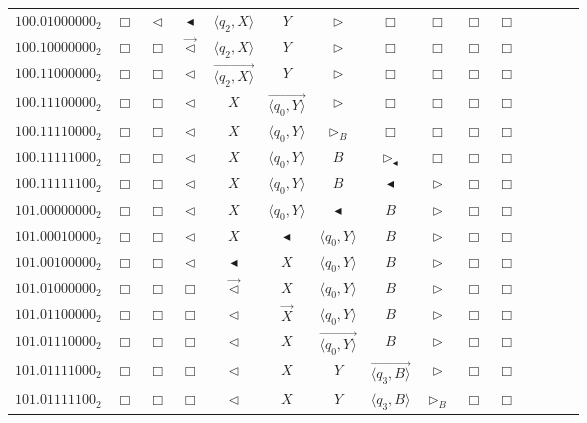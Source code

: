 \documentclass[pre,showpacs,showkeys,preprint]{revtex4}
\theoremstyle{definition}
\begin{document}
\begin{figure}
\begin{center}
{\begin{tabular}{r|cccccccccccccc}
$100.01000000_2$ & $\Box$ & $\lhd$ & $\blacktriangleleft$ & $\langle q_2,X \rangle$ & $Y$ & $\rhd$ & $\Box$ & $\Box$ & $\Box$ & $\Box$ \\
$100.10000000_2$ & $\Box$ & $\Box$ & $\overrightarrow{\lhd}$ & $\langle q_2,X \rangle$ & $Y$ & $\rhd$ & $\Box$ & $\Box$ & $\Box$ & $\Box$ \\
$100.11000000_2$ & $\Box$ & $\Box$ & $\lhd$ & $\overrightarrow{\langle q_2,X \rangle}$ & $Y$ & $\rhd$ & $\Box$ & $\Box$ & $\Box$ & $\Box$ \\
$100.11100000_2$ & $\Box$ & $\Box$ & $\lhd$ & $X$ & $\overrightarrow{\langle q_0,Y \rangle}$ & $\rhd$ & $\Box$ & $\Box$ & $\Box$ & $\Box$ \\
$100.11110000_2$ & $\Box$ & $\Box$ & $\lhd$ & $X$ & $\langle q_0,Y \rangle$ & $\rhd_B$ & $\Box$ & $\Box$ & $\Box$ & $\Box$ \\
$100.11111000_2$ & $\Box$ & $\Box$ & $\lhd$ & $X$ & $\langle q_0,Y \rangle$ & $B$ & $\rhd_\blacktriangleleft$ & $\Box$ & $\Box$ & $\Box$ \\
$100.11111100_2$ & $\Box$ & $\Box$ & $\lhd$ & $X$ & $\langle q_0,Y \rangle$ & $B$ & $\blacktriangleleft$ & $\rhd$ & $\Box$ & $\Box$ \\
$101.00000000_2$ & $\Box$ & $\Box$ & $\lhd$ & $X$ & $\langle q_0,Y \rangle$ & $\blacktriangleleft$ & $B$ & $\rhd$ & $\Box$ & $\Box$ \\
$101.00010000_2$ & $\Box$ & $\Box$ & $\lhd$ & $X$ & $\blacktriangleleft$ & $\langle q_0,Y \rangle$ & $B$ & $\rhd$ & $\Box$ & $\Box$ \\
$101.00100000_2$ & $\Box$ & $\Box$ & $\lhd$ & $\blacktriangleleft$ & $X$ & $\langle q_0,Y \rangle$ & $B$ & $\rhd$ & $\Box$ & $\Box$ \\
$101.01000000_2$ & $\Box$ & $\Box$ & $\Box$ & $\overrightarrow{\lhd}$ & $X$ & $\langle q_0,Y \rangle$ & $B$ & $\rhd$ & $\Box$ & $\Box$ \\
$101.01100000_2$ & $\Box$ & $\Box$ & $\Box$ & $\lhd$ & $\overrightarrow{X}$ & $\langle q_0,Y \rangle$ & $B$ & $\rhd$ & $\Box$ & $\Box$ \\
$101.01110000_2$ & $\Box$ & $\Box$ & $\Box$ & $\lhd$ & $X$ & $\overrightarrow{\langle q_0,Y \rangle}$ & $B$ & $\rhd$ & $\Box$ & $\Box$ \\
$101.01111000_2$ & $\Box$ & $\Box$ & $\Box$ & $\lhd$ & $X$ & $Y$ & $\overrightarrow{\langle q_3,B \rangle}$ & $\rhd$ & $\Box$ & $\Box$ \\
$101.01111100_2$ & $\Box$ & $\Box$ & $\Box$ & $\lhd$ & $X$ & $Y$ & $\langle q_3,B \rangle$ & $\rhd_B$ & $\Box$ & $\Box$ \\

\end{tabular}}
\end{center}
\end{figure}
\end{document}
